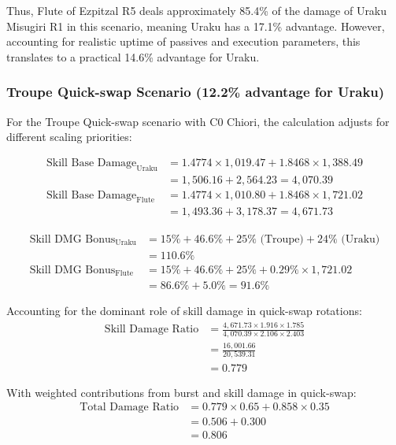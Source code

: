 \documentclass[12pt,a4paper]{article}
\begin{document}
Thus, Flute of Ezpitzal R5 deals approximately 85.4\% of the damage of Uraku Misugiri R1 in this scenario, meaning Uraku has a 17.1\% advantage. However, accounting for realistic uptime of passives and execution parameters, this translates to a practical 14.6\% advantage for Uraku.

\subsubsection{Troupe Quick-swap Scenario (12.2\% advantage for Uraku)}

For the Troupe Quick-swap scenario with C0 Chiori, the calculation adjusts for different scaling priorities:

\begin{align}
\text{Skill Base Damage}_{\text{Uraku}} &= 1.4774 \times 1,019.47 + 1.8468 \times 1,388.49 \\
&= 1,506.16 + 2,564.23 = 4,070.39 \\
\text{Skill Base Damage}_{\text{Flute}} &= 1.4774 \times 1,010.80 + 1.8468 \times 1,721.02 \\
&= 1,493.36 + 3,178.37 = 4,671.73
\end{align}

\begin{align}
\text{Skill DMG Bonus}_{\text{Uraku}} &= 15\% + 46.6\% + 25\% \text{ (Troupe)} + 24\% \text{ (Uraku)} \\
&= 110.6\% \\
\text{Skill DMG Bonus}_{\text{Flute}} &= 15\% + 46.6\% + 25\% + 0.29\% \times 1,721.02 \\
&= 86.6\% + 5.0\% = 91.6\%
\end{align}

Accounting for the dominant role of skill damage in quick-swap rotations:
\begin{align}
\text{Skill Damage Ratio} &= \frac{4,671.73 \times 1.916 \times 1.785}{4,070.39 \times 2.106 \times 2.403} \\
&= \frac{16,001.66}{20,539.31} \\
&= 0.779
\end{align}

With weighted contributions from burst and skill damage in quick-swap:
\begin{align}
\text{Total Damage Ratio} &= 0.779 \times 0.65 + 0.858 \times 0.35 \\
&= 0.506 + 0.300 \\
&= 0.806
\end{align}
\end{document}
